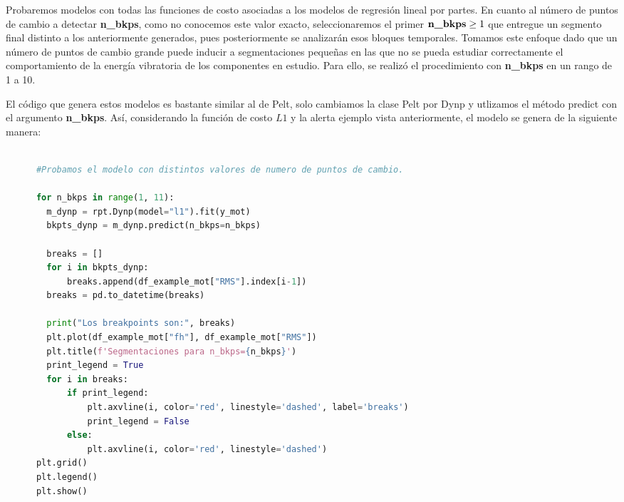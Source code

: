 \documentclass{article}[14pts]
\begin{document}
    Probaremos modelos con todas las funciones de costo asociadas a los modelos de regresión lineal por partes. En cuanto al número de puntos de cambio a detectar \textbf{n\_bkps}, como no conocemos este valor exacto, seleccionaremos el primer $\text{\textbf{n\_bkps}} \geq 1$ que entregue un segmento final distinto a los anteriormente generados, pues posteriormente se analizarán esos bloques temporales. Tomamos este enfoque dado que un número de puntos de cambio grande puede inducir a segmentaciones pequeñas en las que no se pueda estudiar correctamente el comportamiento de la energía vibratoria de los componentes en estudio. Para ello, se realizó el procedimiento con \textbf{n\_bkps} en un rango de 1 a 10.
    
    El código que genera estos modelos es bastante similar al de Pelt, solo cambiamos la clase Pelt por Dynp y utlizamos el método predict con el argumento \textbf{n\_bkps}. Así, considerando la función de costo $L1$ y la alerta ejemplo vista anteriormente, el modelo se genera de la siguiente manera:

    \begin{lstlisting}[language=Python]

      #Probamos el modelo con distintos valores de numero de puntos de cambio.

      for n_bkps in range(1, 11):
        m_dynp = rpt.Dynp(model="l1").fit(y_mot)
        bkpts_dynp = m_dynp.predict(n_bkps=n_bkps)

        breaks = []
        for i in bkpts_dynp:
            breaks.append(df_example_mot["RMS"].index[i-1])
        breaks = pd.to_datetime(breaks)

        print("Los breakpoints son:", breaks)
        plt.plot(df_example_mot["fh"], df_example_mot["RMS"])
        plt.title(f'Segmentaciones para n_bkps={n_bkps}')
        print_legend = True
        for i in breaks:
            if print_legend:
                plt.axvline(i, color='red', linestyle='dashed', label='breaks')
                print_legend = False
            else:
                plt.axvline(i, color='red', linestyle='dashed')
      plt.grid()
      plt.legend()
      plt.show()

    \end{lstlisting}
\end{document}
